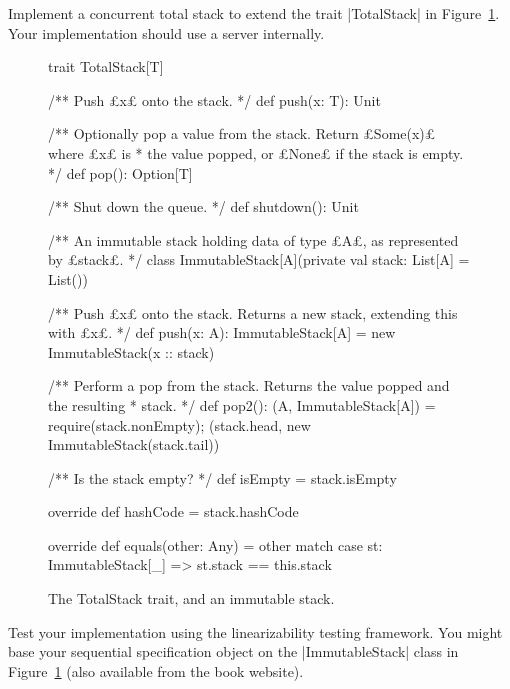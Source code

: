 \begin{questionS}
\label{ex:serverStack}
Implement a concurrent total stack to extend the trait |TotalStack| in
Figure~\ref{fig:immutable-stack}.  Your implementation should use a server
internally.


% 

\begin{figure}
\begin{scala}
trait TotalStack[T]{
  /** Push £x£ onto the stack. */
  def push(x: T): Unit

  /** Optionally pop a value from the stack.  Return £Some(x)£ where £x£ is 
    * the value popped, or £None£ if the stack is empty. */
  def pop(): Option[T]

  /** Shut down the queue. */
  def shutdown(): Unit
}

/** An immutable stack holding data of type £A£, as represented by £stack£. */
class ImmutableStack[A](private val stack: List[A] = List()){
  /** Push £x£ onto the stack.  Returns a new stack, extending this with £x£. */
  def push(x: A): ImmutableStack[A] = new ImmutableStack(x :: stack)

  /** Perform a pop from the stack.  Returns the value popped and the resulting
    * stack. */
  def pop2(): (A, ImmutableStack[A]) = {
    require(stack.nonEmpty); (stack.head, new ImmutableStack(stack.tail))
  }

  /** Is the stack empty? */
  def isEmpty = stack.isEmpty

  override def hashCode = stack.hashCode

  override def equals(other: Any) = other match{
    case st: ImmutableStack[_] => st.stack == this.stack
  }
}
\end{scala}
\caption{The {\scalashape TotalStack} trait, and an immutable stack.}
\label{fig:immutable-stack}
\end{figure}

Test your implementation using the linearizability testing framework.  You
might base your sequential specification object on the |ImmutableStack| class
in Figure~\ref{fig:immutable-stack} (also available from the book website).
\end{questionS}


